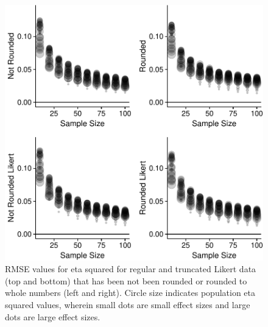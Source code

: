 \documentclass[english,man]{apa6}
\theoremstyle{definition}
\theoremstyle{definition}
\theoremstyle{definition}
\theoremstyle{remark}
\begin{document}
\begin{figure}
\centering
\includegraphics{buchanan_scofield_version2_files/figure-latex/across-graph-rmse-1.pdf}
\caption{\label{fig:across-graph-rmse}RMSE values for eta squared for
regular and truncated Likert data (top and bottom) that has been not
been rounded or rounded to whole numbers (left and right). Circle size
indicates population eta squared values, wherein small dots are small
effect sizes and large dots are large effect sizes.}
\end{figure}
\end{document}
